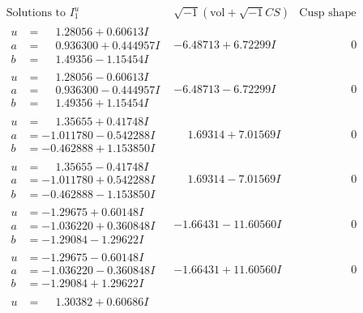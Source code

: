 \documentclass[1p]{elsarticle_modified}
\theoremstyle{definition}
\newcommand{\I}{\sqrt{-1}}
\begin{document}
$$\begin{array}{c|c|c}
\text{Solutions to }I^u_{1}& \I (\text{vol} + \sqrt{-1}CS) & \text{Cusp shape}\\
 \hline 
\begin{aligned}
u &= \phantom{-}1.28056 + 0.60613 I \\
a &= \phantom{-}0.936300 + 0.444957 I \\
b &= \phantom{-}1.49356 - 1.15454 I\end{aligned}
 & -6.48713 + 6.72299 I & \phantom{-0.000000 } 0 \\ \hline\begin{aligned}
u &= \phantom{-}1.28056 - 0.60613 I \\
a &= \phantom{-}0.936300 - 0.444957 I \\
b &= \phantom{-}1.49356 + 1.15454 I\end{aligned}
 & -6.48713 - 6.72299 I & \phantom{-0.000000 } 0 \\ \hline\begin{aligned}
u &= \phantom{-}1.35655 + 0.41748 I \\
a &= -1.011780 - 0.542288 I \\
b &= -0.462888 + 1.153850 I\end{aligned}
 & \phantom{-}1.69314 + 7.01569 I & \phantom{-0.000000 } 0 \\ \hline\begin{aligned}
u &= \phantom{-}1.35655 - 0.41748 I \\
a &= -1.011780 + 0.542288 I \\
b &= -0.462888 - 1.153850 I\end{aligned}
 & \phantom{-}1.69314 - 7.01569 I & \phantom{-0.000000 } 0 \\ \hline\begin{aligned}
u &= -1.29675 + 0.60148 I \\
a &= -1.036220 + 0.360848 I \\
b &= -1.29084 - 1.29622 I\end{aligned}
 & -1.66431 - 11.60560 I & \phantom{-0.000000 } 0 \\ \hline\begin{aligned}
u &= -1.29675 - 0.60148 I \\
a &= -1.036220 - 0.360848 I \\
b &= -1.29084 + 1.29622 I\end{aligned}
 & -1.66431 + 11.60560 I & \phantom{-0.000000 } 0 \\ \hline\begin{aligned}
u &= \phantom{-}1.30382 + 0.60686 I \\

\end{aligned}
\end{array}$$
\end{document}

